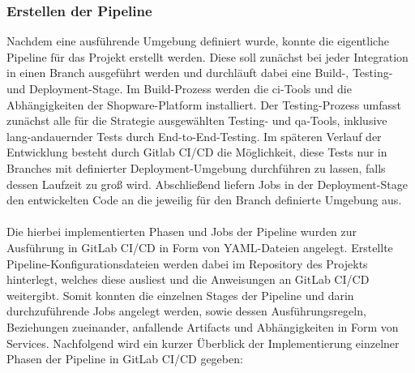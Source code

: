 \subsubsection{Erstellen der Pipeline}

Nachdem eine ausführende Umgebung definiert wurde, konnte die eigentliche Pipeline für das Projekt erstellt werden.
Diese soll zunächst bei jeder Integration in einen Branch ausgeführt werden und durchläuft dabei eine Build-,
Testing- und Deployment-Stage.
Im Build-Prozess werden die \acrshort{ci}-Tools und die Abhängigkeiten der Shopware-Platform installiert.
Der Testing-Prozess umfasst zunächst alle für die Strategie ausgewählten Testing- und \acrshort{qa}-Tools, inklusive
lang-andauernder Tests durch End-to-End-Testing.
Im späteren Verlauf der Entwicklung besteht durch Gitlab CI/CD die Möglichkeit, diese Tests nur in Branches mit
definierter Deployment-Umgebung durchführen zu lassen, falls dessen Laufzeit zu groß wird.
Abschließend liefern Jobs in der Deployment-Stage den entwickelten Code an die jeweilig für den Branch definierte
Umgebung aus.
\\\\
Die hierbei implementierten Phasen und Jobs der Pipeline wurden zur Ausführung in GitLab CI/CD in Form von YAML-Dateien
angelegt.
Erstellte Pipeline-Konfigurationsdateien werden dabei im Repository des Projekts hinterlegt, welches diese ausliest und
die Anweisungen an GitLab CI/CD weitergibt.
Somit konnten die einzelnen Stages der Pipeline und darin durchzuführende Jobs angelegt werden, sowie dessen
Ausführungsregeln, Beziehungen zueinander, anfallende Artifacts und Abhängigkeiten in Form von Services.
Nachfolgend wird ein kurzer Überblick der Implementierung einzelner Phasen der Pipeline in GitLab CI/CD gegeben:

